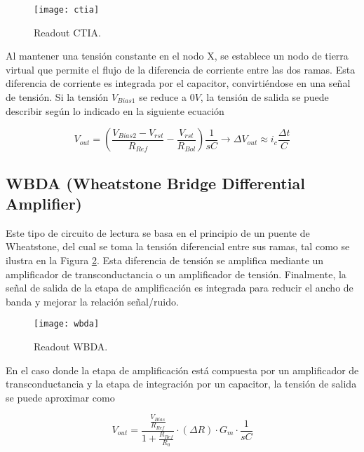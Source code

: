 \newpage
            \begin{figure}[hbtp]
                \centering
                \texttt{[image: ctia]}
                \caption{Readout CTIA.}
                \label{fig:ctia}
            \end{figure}

Al mantener una tensión constante en el nodo X, se establece un nodo de tierra virtual que permite el flujo de la diferencia de corriente entre las dos ramas. Esta diferencia de corriente es integrada por el capacitor, convirtiéndose en una señal de tensión. Si la tensión $V_{Bias1}$ se reduce a $0V$, la tensión de salida se puede describir según lo indicado en la siguiente ecuación \cite{BlancoMDA}

        \begin{equation}
        V_{out} =\left(\frac{V_{Bias2}-V_{rst}}{R_{Ref}}-\frac{V_{rst}}{R_{Bol}}\right) \frac{1}{sC} \to \Delta V_{out} \approx i_{c}\frac{\Delta t}{C}
        \label{eq:ctia}
        \end{equation}


\subsection{WBDA (Wheatstone Bridge Differential Amplifier)}
Este tipo de circuito de lectura se basa en el principio de un puente de Wheatstone, del cual se toma la tensión diferencial entre sus ramas, tal como se ilustra en la Figura \ref{fig:wbda}. Esta diferencia de tensión se amplifica mediante un amplificador de transconductancia o un amplificador de tensión. Finalmente, la señal de salida de la etapa de amplificación es integrada para reducir el ancho de banda y mejorar la relación señal/ruido.
\newpage
            \begin{figure}[hbtp]
                \centering
                \texttt{[image: wbda]}
                \caption{Readout WBDA.}
                \label{fig:wbda}
            \end{figure}


En el caso donde la etapa de amplificación está compuesta por un amplificador de transconductancia y la etapa de integración por un capacitor, la tensión de salida se puede aproximar como

        \begin{equation}
        V_{out} = \frac{\frac{V_{Bias}}{R_{Ref}}}{1+\frac{R_{Ref}}{R_{0}}}\cdot (\Delta R)\cdot G_{m}\cdot \frac{1}{sC}
        \label{eq:wbda}
        \end{equation}
        
